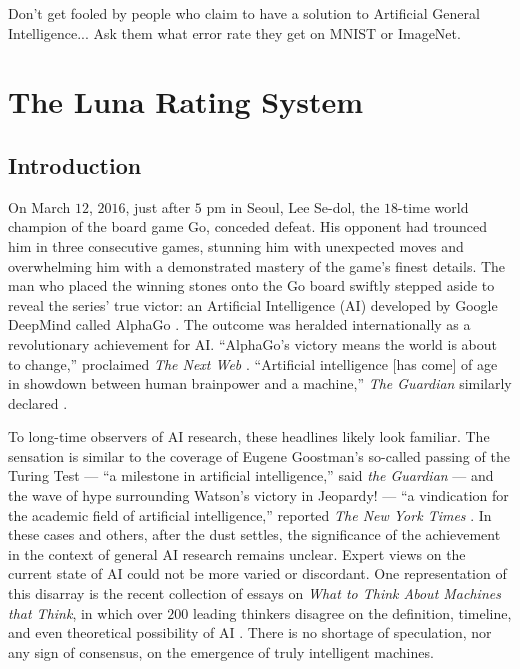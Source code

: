 \begin{savequote}[75mm]
Don't get fooled by people who claim to have a solution to Artificial General Intelligence... Ask them what error rate they get on MNIST or ImageNet.
\end{savequote}


\chapter{The Luna Rating System}

\section{Introduction}

On March $12$, $2016$, just after $5$ pm in Seoul, Lee Se-dol, the $18$-time world champion of the board game Go, conceded defeat. His opponent had trounced him in three consecutive games, stunning him with unexpected moves and overwhelming him with a demonstrated mastery of the game's finest details. The man who placed the winning stones onto the Go board swiftly stepped aside to reveal the series' true victor: an Artificial Intelligence (AI) developed by Google DeepMind called AlphaGo \citep{silver2016mastering}. The outcome was heralded internationally as a revolutionary achievement for AI. ``AlphaGo's victory means the world is about to change,'' proclaimed \textit{The Next Web} \citep{1_nextweb_2016}. ``Artificial intelligence [has come] of age in showdown between human brainpower and a machine,'' \textit{The Guardian} similarly declared \citep{1_the_guardian_2016}. 

To long-time observers of AI research, these headlines likely look familiar. The sensation is similar to the coverage of Eugene Goostman's so-called passing of the Turing Test --- ``a milestone in artificial intelligence,'' said \textit{the Guardian} \citep{1_the_guardian_2014, occasional_pamphlet_2014} --- and the wave of hype surrounding Watson's victory in Jeopardy! --- ``a vindication for the academic field of artificial intelligence,'' reported \textit{The New York Times} \citep{1_newyorktimes_2011}. In these cases and others, after the dust settles, the significance of the achievement in the context of general AI research remains unclear. Expert views on the current state of AI could not be more varied or discordant. One representation of this disarray is the recent collection of essays on \textit{What to Think About Machines that Think}, in which over $200$ leading thinkers disagree on the definition, timeline, and even theoretical possibility of AI \citep{edge2016what}. There is no shortage of speculation, nor any sign of consensus, on the emergence of truly intelligent machines.

